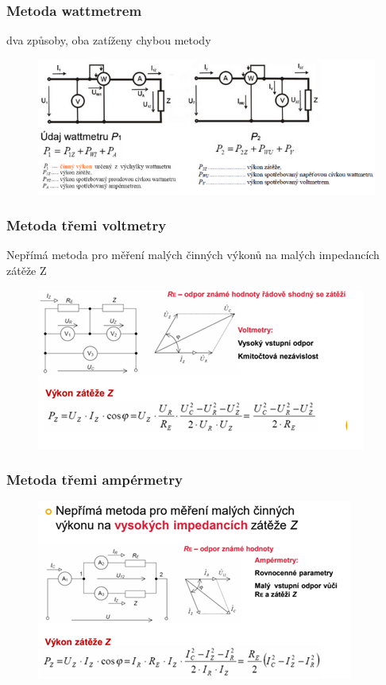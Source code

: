 \subsubsection*{Metoda wattmetrem}
dva způsoby, oba zatíženy chybou metody
\begin{figure}[H]
    \includegraphics*[scale = 1]{images/wattmetry2.png}
\end{figure}
\newpage

\subsubsection*{Metoda třemi voltmetry}
Nepřímá metoda pro měření malých činných výkonů na malých impedancích zátěže Z
\begin{figure}[H]
    \includegraphics*[scale = 1.5]{images/voltrmetry3.png}
\end{figure}

\subsubsection*{Metoda třemi ampérmetry}
\begin{figure}[H]
    \includegraphics*[scale = 1.5]{images/ampermetry3.png}
\end{figure}

